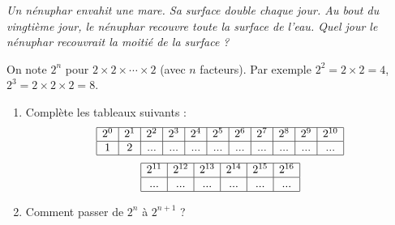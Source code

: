 \documentclass[class=report,crop=false, 12pt]{standalone}
\begin{document}

\emph{Un nénuphar envahit une mare. Sa surface double chaque jour. Au bout du vingtième jour, le nénuphar recouvre toute la surface de l'eau. Quel jour le nénuphar recouvrait la moitié de la surface ?}

\bigskip
\bigskip


\begin{activite}

On note $2^n$ pour $2 \times 2 \times \cdots \times 2$ (avec $n$ facteurs). Par exemple $2^2 = 2 \times 2  = 4$, $2^3 = 2 \times 2 \times 2 = 8$. 

\begin{enumerate}
  \item  Complète les tableaux suivants :
$$
\begin{array}{|c|c|c|c|c|c|c|c|c|c|c|}
  \hline  
  2^0 & 2^1 & 2^2 & 2^3 & 2^4 & 2^5 & 2^6 & 2^7 & 2^8 & 2^9 & 2^{10}  \\
  \hline  
   1  &  2  & ... & ... & ... & ... & ... & ... & ... & ... & ...   \\ 
  \hline

\end{array}
$$
$$
\begin{array}{|c|c|c|c|c|c|c|c|c|c|c|}
  \hline
  2^{11} & 2^{12} & 2^{13} & 2^{14} & 2^{15} & 2^{16}  \\
  \hline
  ... &  ...   &  ...   &  ...   &  ...   &  ...  \\ 
  \hline
\end{array}
$$  


  \item Comment passer de $2^{n}$ à $2^{n+1}$ ?
  
  
\end{enumerate}
\end{activite}
\end{document}
